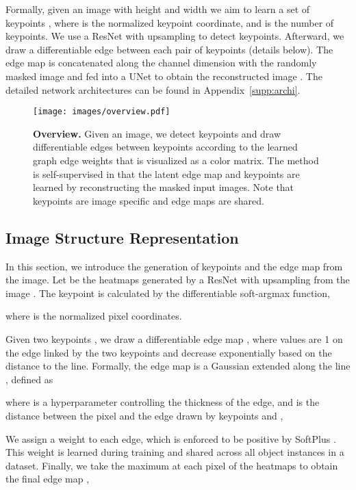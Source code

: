 \documentclass{article}
\begin{document}
Formally, given an image  with height  and width  we aim to learn a set of keypoints , where  is the normalized keypoint coordinate, and  is the number of keypoints. 
We use a ResNet with upsampling \cite{xiao2018simple} to detect keypoints. Afterward, we draw a differentiable edge \cite{mihai2021differentiable} between each pair of keypoints (details below). 
The edge map  is concatenated along the channel dimension with the randomly masked image  and fed into a UNet \cite{ronneberger2015u} to obtain the reconstructed image . The detailed network architectures can be found in Appendix~\ref{supp:archi}. 

\begin{figure}[t]
\begin{center}
  \texttt{[image: images/overview.pdf]}
\end{center}
   \caption{\textbf{Overview.} Given an image, we detect keypoints and draw differentiable edges between keypoints according to the learned graph edge weights that is visualized as a color matrix. The method is self-supervised in that the latent edge map and keypoints are learned by reconstructing the masked input images. Note that keypoints are image specific and edge maps are shared.}
\label{fig:overview}
\end{figure}

\subsection{Image Structure Representation}

In this section, we introduce the generation of keypoints and the edge map from the image.
Let  be the  heatmaps generated by a ResNet with upsampling \cite{xiao2018simple} from the image . The keypoint  is calculated by the differentiable soft-argmax function,

where  is the normalized pixel coordinates.

Given two keypoints , we draw a differentiable edge map , where values are 1 on the edge linked by the two keypoints and decrease exponentially based on the distance to the line. Formally, the edge map  is a Gaussian extended along the line \cite{mihai2021differentiable}, defined as

where  is a hyperparameter controlling the thickness of the edge, and  is the  distance between the pixel  and the edge drawn by keypoints  and ,


We assign a weight  to each edge, which is enforced to be positive by SoftPlus \cite{dugas2000incorporating}. This weight is learned during training and shared across all object instances in a dataset. 
Finally, we take the maximum at each pixel of the heatmaps to obtain the final edge map ,
\end{document}
